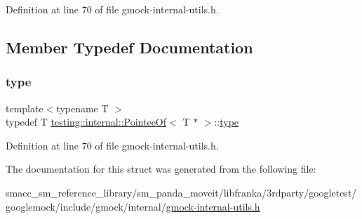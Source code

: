 Definition at line 70 of file gmock-\/internal-\/utils.\+h.



\subsection{Member Typedef Documentation}
\mbox{\label{structtesting_1_1internal_1_1PointeeOf_3_01T_01_5_01_4_a91dde514cd3a8c07cedbe5336c36a55f}} 
\subsubsection{\texorpdfstring{type}{type}}
{\footnotesize\ttfamily template$<$typename T $>$ \\
typedef T \hyperlink{structtesting_1_1internal_1_1PointeeOf}{testing\+::internal\+::\+Pointee\+Of}$<$ T $\ast$ $>$\+::\hyperlink{structtesting_1_1internal_1_1PointeeOf_3_01T_01_5_01_4_a91dde514cd3a8c07cedbe5336c36a55f}{type}}



Definition at line 70 of file gmock-\/internal-\/utils.\+h.



The documentation for this struct was generated from the following file\+:\begin{DoxyCompactItemize}
\item 
smacc\+\_\+sm\+\_\+reference\+\_\+library/sm\+\_\+panda\+\_\+moveit/libfranka/3rdparty/googletest/googlemock/include/gmock/internal/\hyperlink{gmock-internal-utils_8h}{gmock-\/internal-\/utils.\+h}\end{DoxyCompactItemize}
